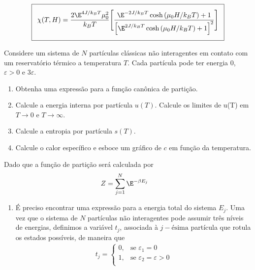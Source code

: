 \begin{prob}
\begin{sol}
\begin{enumerate}[label=\alph *)]
      \begin{align}
        \addtolength{\fboxsep}{5pt}
         \boxed{
         \begin{gathered}
          \chi(T,H)=\frac{2\E^{4J/k_BT}\mu_0^2}{k_BT}\Biggl[\frac{\E^{-2J/k_BT}\cosh\left(\mu_0H/k_BT\right)+1}{\left[\E^{2J/k_BT}\cosh\left(\mu_0H/k_BT\right)+1\right]^2}\Biggr]               
         \end{gathered}
        }
      \end{align}
    \end{enumerate}
  \end{sol}
\end{prob}
\begin{prob}
  Considere um sistema de $N$ partículas clássicas não interagentes em contato com um reservatório térmico a temperatura $T$. Cada partícula pode ter energia $0$, $\varepsilon>0$ e $3\varepsilon$.
  \begin{enumerate}[label=\alph *)]
    \item Obtenha uma expressão para a função canônica de partição.
    \item Calcule a energia interna por partícula $u(T)$. Calcule os limites de u(T) em $T\to0$ e $T\to\infty$.
    \item Calcule a entropia por partícula $s(T)$.
    \item Calcule o calor específico e esboce um gráfico de $c$ em função da temperatura.
  \end{enumerate}
  \begin{sol}
    Dado que a função de partição será calculada por
    \begin{align}
      Z&=\sum_{j=1}^N\E^{-\beta E_j}
    \end{align}
    \begin{enumerate}[label=\alph *)]
      \item É preciso encontrar uma expressão para a energia total do sistema $E_j$. Uma vez que o sistema de $N$ partículas não interagentes pode assumir três níveis de energias, definimos a variável $t_j$, associada à $j-\textrm{ésima}$ partícula que rotula os estados possíveis, de maneira que      
      \begin{align}
        t_j=
        \begin{cases}
          0,& \textrm{se }\varepsilon_1=0\\
          1,& \textrm{se }\varepsilon_2=\varepsilon>0\\

\end{cases}
\end{align}
\end{enumerate}
\end{sol}
\end{prob}
